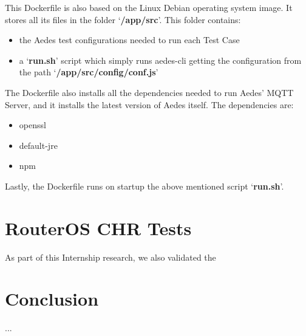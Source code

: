 \documentclass[binding=0.6cm,noexaminfo]{sapthesis}
\begin{document}
This Dockerfile is also based on the Linux Debian operating system image. It stores all its files in the folder `\textbf{/app/src}'. This folder contains:
\begin{itemize}
	\item the Aedes test configurations needed to run each Test Case
	\item a `\textbf{run.sh}' script which simply runs aedes-cli getting the configuration from the path `\textbf{/app/src/config/conf.js}'
\end{itemize}
The Dockerfile also installs all the dependencies needed to run Aedes' MQTT Server, and it installs the latest version of Aedes itself.
The dependencies are:
\begin{itemize}
	\item openssl
	\item default-jre
	\item npm
\end{itemize}
Lastly, the Dockerfile runs on startup the above mentioned script `\textbf{run.sh}'.
\chapter{RouterOS CHR Tests}
As part of this Internship research, we also validated the 

\chapter{Conclusion} ...
\backmatter
\cleardoublepage
{} %
\end{document}
